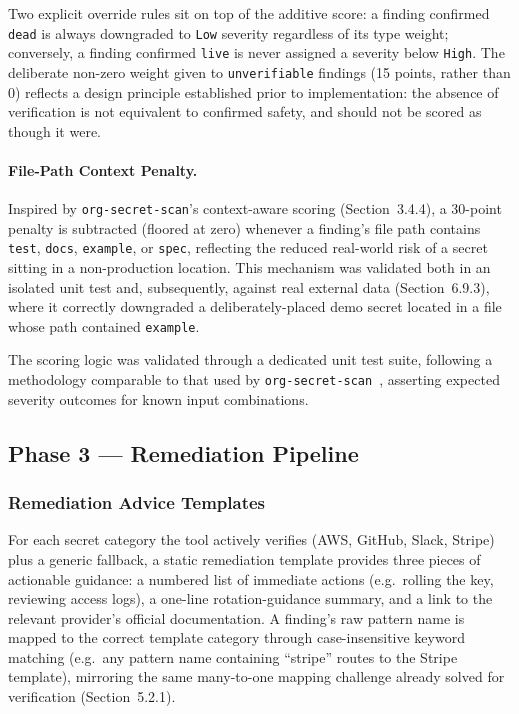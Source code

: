 \documentclass[12pt]{article}
\begin{document}
Two explicit override rules sit on top of the additive score: a finding confirmed \texttt{dead} is always downgraded to \texttt{Low} severity regardless of its type weight; conversely, a finding confirmed \texttt{live} is never assigned a severity below \texttt{High}. The deliberate non-zero weight given to \texttt{unverifiable} findings (15 points, rather than 0) reflects a design principle established prior to implementation: the absence of verification is not equivalent to confirmed safety, and should not be scored as though it were.

\paragraph{File-Path Context Penalty.}
Inspired by \texttt{org-secret-scan}'s context-aware scoring (Section~3.4.4), a 30-point penalty is subtracted (floored at zero) whenever a finding's file path contains \texttt{test}, \texttt{docs}, \texttt{example}, or \texttt{spec}, reflecting the reduced real-world risk of a secret sitting in a non-production location. This mechanism was validated both in an isolated unit test and, subsequently, against real external data (Section~6.9.3), where it correctly downgraded a deliberately-placed demo secret located in a file whose path contained \texttt{example}.

The scoring logic was validated through a dedicated unit test suite, following a methodology comparable to that used by \texttt{org-secret-scan}~\cite{orgsecretscan}, asserting expected severity outcomes for known input combinations.

\subsection{Phase 3 --- Remediation Pipeline}

\subsubsection{Remediation Advice Templates}

For each secret category the tool actively verifies (AWS, GitHub, Slack, Stripe) plus a generic fallback, a static remediation template provides three pieces of actionable guidance: a numbered list of immediate actions (e.g.\ rolling the key, reviewing access logs), a one-line rotation-guidance summary, and a link to the relevant provider's official documentation. A finding's raw pattern name is mapped to the correct template category through case-insensitive keyword matching (e.g.\ any pattern name containing ``stripe'' routes to the Stripe template), mirroring the same many-to-one mapping challenge already solved for verification (Section~5.2.1).
\end{document}
